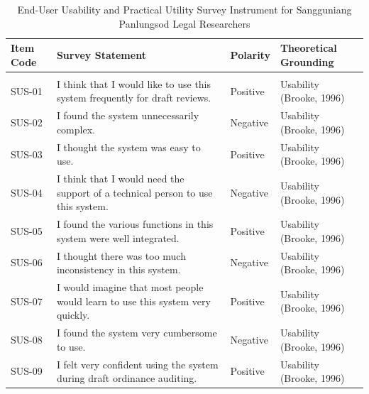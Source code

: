     \begin{table}[!htbp]
        \centering
        \footnotesize
        \setlength{\tabcolsep}{2.5pt}
        \renewcommand{\arraystretch}{0.92}
        \caption[End-User Usability and Practical Utility Survey Instrument]{End-User Usability and Practical Utility Survey Instrument for Sangguniang Panlungsod Legal Researchers}
        \label{tab:usability_survey_instrument}
        \begin{tabularx}{\linewidth}{>{\centering\arraybackslash}p{1.4cm}>{\RaggedRight\arraybackslash}X>{\centering\arraybackslash}p{1.6cm}>{\RaggedRight\arraybackslash}p{3.2cm}}
            \toprule
            \textbf{Item Code} & \textbf{Survey Statement} & \textbf{Polarity} & \textbf{Theoretical Grounding} \\
            \midrule
            \multicolumn{4}{l}{\textit{\textbf{System Usability Scale (SUS; Brooke, 1996)}}} \\
            \midrule
            SUS-01 & I think that I would like to use this system frequently for draft reviews. & Positive & Usability (Brooke, 1996)~\cite{brooke1996sus} \\
            SUS-02 & I found the system unnecessarily complex. & Negative & Usability (Brooke, 1996)~\cite{brooke1996sus} \\
            SUS-03 & I thought the system was easy to use. & Positive & Usability (Brooke, 1996)~\cite{brooke1996sus} \\
            SUS-04 & I think that I would need the support of a technical person to use this system. & Negative & Usability (Brooke, 1996)~\cite{brooke1996sus} \\
            SUS-05 & I found the various functions in this system were well integrated. & Positive & Usability (Brooke, 1996)~\cite{brooke1996sus} \\
            SUS-06 & I thought there was too much inconsistency in this system. & Negative & Usability (Brooke, 1996)~\cite{brooke1996sus} \\
            SUS-07 & I would imagine that most people would learn to use this system very quickly. & Positive & Usability (Brooke, 1996)~\cite{brooke1996sus} \\
            SUS-08 & I found the system very cumbersome to use. & Negative & Usability (Brooke, 1996)~\cite{brooke1996sus} \\
            SUS-09 & I felt very confident using the system during draft ordinance auditing. & Positive & Usability (Brooke, 1996)~\cite{brooke1996sus} \\

\end{tabularx}
\end{table}
